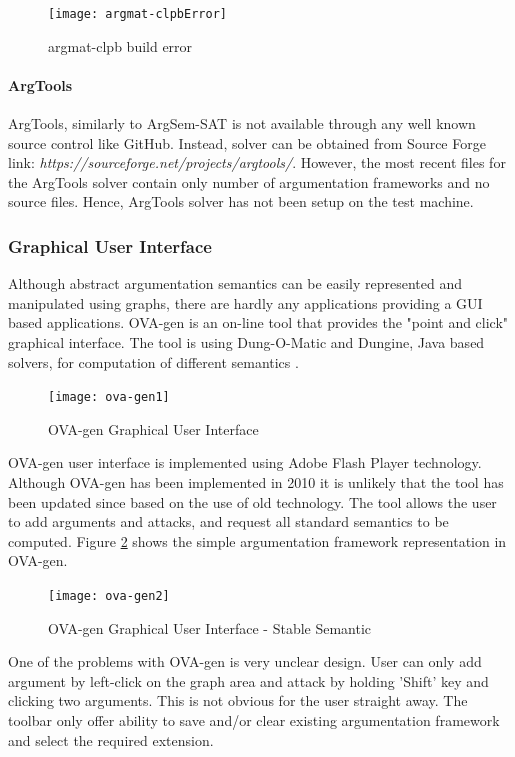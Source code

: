 \begin{figure}[h]
	\centering
	\texttt{[image: argmat-clpbError]}
	\caption{argmat-clpb build error}
	\label{fig:argmatClpbError}
\end{figure}

\paragraph{ArgTools}
ArgTools, similarly to ArgSem-SAT is not available through any well known source control like GitHub. Instead, solver can be obtained from Source Forge link: \textit{https://sourceforge.net/projects/argtools/}. However, the most recent files for the ArgTools solver contain only number of argumentation frameworks and no source files. Hence, ArgTools solver has not been setup on the test machine.


\subsubsection{Graphical User Interface}
Although abstract argumentation semantics can be easily represented and manipulated using graphs, there are hardly any applications providing a GUI based applications. OVA-gen is an on-line tool that provides the "point and click" graphical interface. The tool is using Dung-O-Matic and Dungine, Java based solvers, for computation of different semantics \citep{ova-gen}. 

\begin{figure}[h]
	\centering
	\texttt{[image: ova-gen1]}
	\caption{OVA-gen Graphical User Interface}
	\label{fig:ovagen1}
\end{figure}

OVA-gen user interface is implemented using Adobe Flash Player technology. Although OVA-gen has been implemented in 2010 it is unlikely that the tool has been updated since based on the use of old technology. The tool allows the user to add arguments and attacks, and request all standard semantics to be computed. Figure \ref{fig:ovagen1} shows the simple argumentation framework representation in OVA-gen.

\begin{figure}[h]
	\centering
	\texttt{[image: ova-gen2]}
	\caption{OVA-gen Graphical User Interface - Stable Semantic}
	\label{fig:ovagen2}
\end{figure}

One of the problems with OVA-gen is very unclear design. User can only add argument by left-click on the graph area and attack by holding 'Shift' key and clicking two arguments. This is not obvious for the user straight away. The toolbar only offer ability to save and/or clear existing argumentation framework and select the required extension. 

